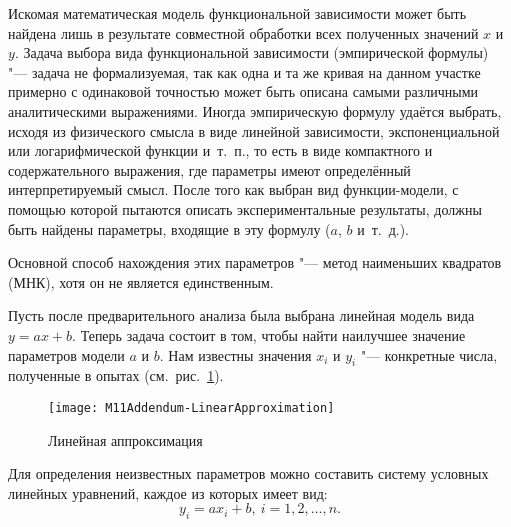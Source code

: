 \documentclass[a4paper, 12pt]{extarticle}
\begin{document}
Искомая математическая модель функциональной зависимости может быть найдена лишь в результате совместной обработки всех полученных значений $x$ и $y$. Задача выбора вида функциональной зависимости (эмпирической формулы) "--- задача не формализуемая, так как одна и та же кривая на данном участке примерно с одинаковой точностью может быть описана самыми различными аналитическими выражениями. %
Иногда эмпирическую формулу удаётся выбрать, исходя из физического смысла в виде линейной зависимости, экспоненциальной или логарифмической функции и~т.~п., то есть в виде компактного и содержательного выражения, где параметры имеют определённый интерпретируемый смысл. После того как выбран вид функции-модели, с помощью которой пытаются описать экспериментальные результаты, должны быть найдены параметры, входящие в эту формулу ($a$, $b$ и~т.~д.). %

Основной способ нахождения этих параметров "--- метод наименьших квадратов (МНК), хотя он не является единственным.

Пусть после предварительного анализа была выбрана линейная модель вида $y=ax + b$. Теперь задача состоит в том, чтобы найти наилучшее значение параметров модели $a$ и $b$. Нам известны значения $x_i$ и $y_i$ "--- конкретные числа, полученные в опытах (см.~рис.~\ref{fig:m11-linear-approx}).

\begin{figure}[h]
\begin{center}
\texttt{[image: M11Addendum-LinearApproximation]}
\end{center}
\vspace{-14pt}
\caption{Линейная аппроксимация \label{fig:m11-linear-approx}}
\end{figure}

Для определения неизвестных параметров можно составить систему условных линейных уравнений, каждое из которых имеет вид: %
\begin{equation}
\label{eq:m11-linear-approx}
y_i = a x_i + b,\ i = 1, 2, \ldots, n. %
\end{equation}
\end{document}
